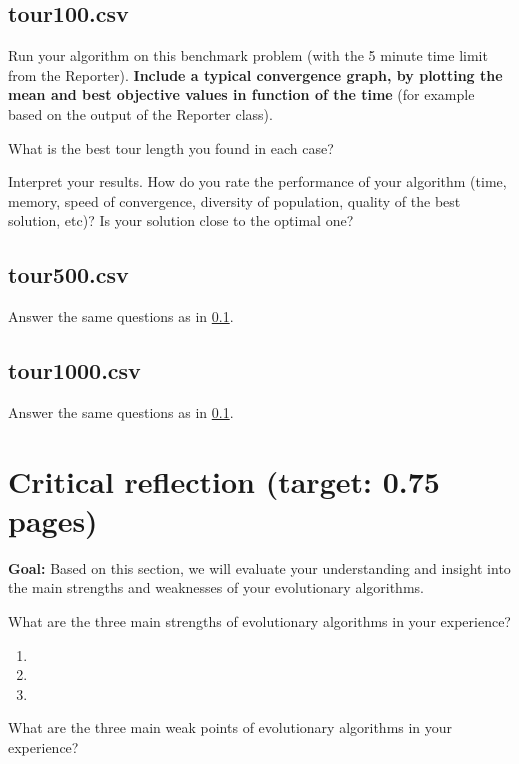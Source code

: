 \documentclass[a4paper,10pt]{article}
\newcommand{\ReplaceMe}[1]{{\color{blue}#1}}
\newcommand{\RemoveMe}[1]{{\color{purple}#1}}
\begin{document}
\subsection{tour100.csv}\label{sec_shorttour}

\ReplaceMe{Run your algorithm on this benchmark problem (with the 5 minute time limit from the Reporter). \textbf{Include a typical convergence graph, by plotting the mean and best objective values in function of the time} (for example based on the output of the Reporter class).

What is the best tour length you found in each case? 

Interpret your results. How do you rate the performance of your algorithm (time, memory, speed of convergence, diversity of population, quality of the best solution, etc)? Is your solution close to the optimal one?}

\subsection{tour500.csv}

\ReplaceMe{Answer the same questions as in \cref{sec_shorttour}.}

\subsection{tour1000.csv}

\ReplaceMe{Answer the same questions as in \cref{sec_shorttour}.}

\section{Critical reflection (target: 0.75 pages)}

\RemoveMe{\textbf{Goal:} Based on this section, we will evaluate your understanding and insight into the main strengths and weaknesses of your evolutionary algorithms.}

\ReplaceMe{What are the three main strengths of evolutionary algorithms in your experience?}

\begin{enumerate}
 \item 
 \item 
 \item 
\end{enumerate}

\ReplaceMe{What are the three main weak points of evolutionary algorithms in your experience?}
\end{document}
